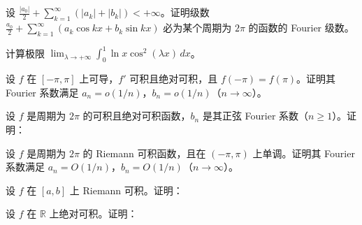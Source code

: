 \noindent\begin{minipage}{\textwidth}
设 $\displaystyle\frac{|a_0|}2+\sum_{k=1}^\infty(|a_k|+|b_k|)<+\infty$。证明级数 $\displaystyle\frac{a_0}2+\sum_{k=1}^\infty(a_k\cos kx+b_k\sin kx)$ 必为某个周期为 $2\pi$ 的函数的 Fourier 级数。
\end{minipage}\par\vfill
\noindent\begin{minipage}{\textwidth}
计算极限 $\displaystyle\lim_{\lambda\to+\infty}\int_0^1\ln x\cos^2(\lambda x)\,dx$。
\end{minipage}\par\vfill
\newpage
\noindent\begin{minipage}{\textwidth}
设 $f$ 在 $[-\pi,\pi]$ 上可导，$f'$ 可积且绝对可积，且 $f(-\pi)=f(\pi)$。证明其 Fourier 系数满足 $a_n=o(1/n)$，$b_n=o(1/n)$（$n\to\infty$）。
\end{minipage}\par\vfill
\noindent\begin{minipage}{\textwidth}
设 $f$ 是周期为 $2\pi$ 的可积且绝对可积函数，$b_n$ 是其正弦 Fourier 系数（$n\ge1$）。证明：
\end{minipage}\par\vfill
\noindent\begin{minipage}{\textwidth}
设 $f$ 是周期为 $2\pi$ 的 Riemann 可积函数，且在 $(-\pi,\pi)$ 上单调。证明其 Fourier 系数满足 $a_n=O(1/n)$，$b_n=O(1/n)$（$n\to\infty$）。
\end{minipage}\par\vfill
\newpage
\noindent\begin{minipage}{\textwidth}
设 $f$ 在 $[a,b]$ 上 Riemann 可积。证明：
\end{minipage}\par\vfill
\noindent\begin{minipage}{\textwidth}
设 $f$ 在 $\mathbb R$ 上绝对可积。证明：
\end{minipage}\par\vfill

